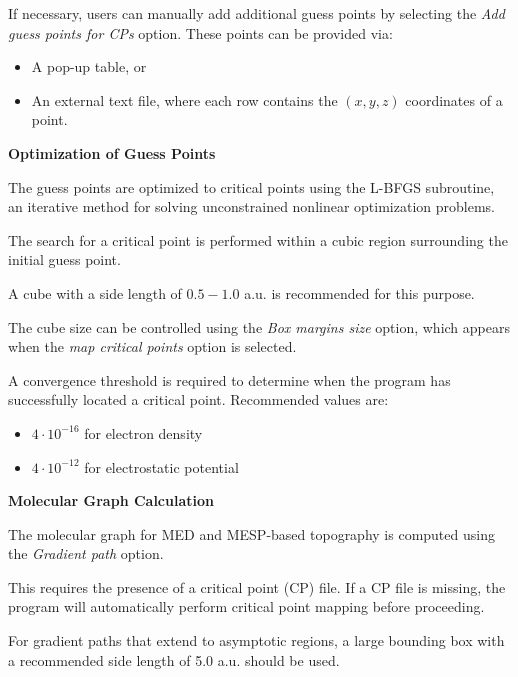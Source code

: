 \documentclass[10pt]{article}
\begin{document}
If necessary, users can manually add additional guess points
by selecting the {\it Add guess points for CPs} option.
These points can be provided via:

\begin{itemize}
\item A pop-up table, or
\item An external text file, where each row contains the $(x,y,z)$ coordinates of a point.
\end{itemize}

\vspace*{3mm}
{\bf Optimization of Guess Points}
\vspace*{3mm}

The guess points are optimized to critical points using
the L-BFGS subroutine, an iterative method for solving unconstrained nonlinear optimization problems.

The search for a critical point is performed within
a cubic region surrounding the initial guess point.

A cube with a side length of $0.5-1.0$ a.u.
is recommended for this purpose.

The cube size can be controlled using the
{\it Box margins size} option, which appears
when the {\it map critical points} option is selected.

A convergence threshold is required to determine
when the program has successfully located a critical point.
Recommended values are:

\begin{itemize}
\item $4 \cdot 10^{-16}$ for electron density
\item $4 \cdot 10^{-12}$ for electrostatic potential
\end{itemize}

\vspace*{3mm}
{\bf Molecular Graph Calculation}
\vspace*{3mm}

The molecular graph for MED and MESP-based topography
is computed using the {\it Gradient path} option.

This requires the presence of a critical point (CP) file.
If a CP file is missing, the program will automatically
perform critical point mapping before proceeding.

For gradient paths that extend to asymptotic regions,
a large bounding box with a recommended side length of 5.0 a.u. should be used.
\end{document}
